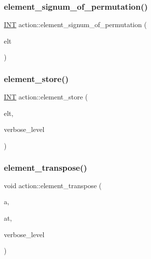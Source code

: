 \subsubsection{\texorpdfstring{element\+\_\+signum\+\_\+of\+\_\+permutation()}{element\_signum\_of\_permutation()}}
{\footnotesize\ttfamily \mbox{\hyperlink{galois_8h_a09fddde158a3a20bd2dcadb609de11dc}{I\+NT}} action\+::element\+\_\+signum\+\_\+of\+\_\+permutation (\begin{DoxyParamCaption}\item[{void $\ast$}]{elt }\end{DoxyParamCaption})}

\mbox{\label{classaction_ab969a7009cc85c12f988a18a06b5db64}} 
\subsubsection{\texorpdfstring{element\+\_\+store()}{element\_store()}}
{\footnotesize\ttfamily \mbox{\hyperlink{galois_8h_a09fddde158a3a20bd2dcadb609de11dc}{I\+NT}} action\+::element\+\_\+store (\begin{DoxyParamCaption}\item[{void $\ast$}]{elt,  }\item[{\mbox{\hyperlink{galois_8h_a09fddde158a3a20bd2dcadb609de11dc}{I\+NT}}}]{verbose\+\_\+level }\end{DoxyParamCaption})}

\mbox{\label{classaction_abecb246cacc5cc3987c6866068e6f505}} 
\subsubsection{\texorpdfstring{element\+\_\+transpose()}{element\_transpose()}}
{\footnotesize\ttfamily void action\+::element\+\_\+transpose (\begin{DoxyParamCaption}\item[{void $\ast$}]{a,  }\item[{void $\ast$}]{at,  }\item[{\mbox{\hyperlink{galois_8h_a09fddde158a3a20bd2dcadb609de11dc}{I\+NT}}}]{verbose\+\_\+level }\end{DoxyParamCaption})}


